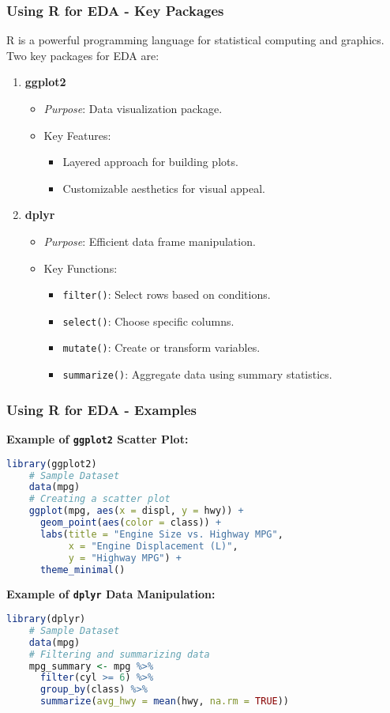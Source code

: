 \documentclass[aspectratio=169]{beamer}
\begin{document}
\begin{frame}[fragile]
    \frametitle{Using R for EDA - Key Packages}
    R is a powerful programming language for statistical computing and graphics. Two key packages for EDA are:

    \begin{enumerate}
        \item \textbf{ggplot2}
        \begin{itemize}
            \item \textit{Purpose}: Data visualization package.
            \item Key Features:
            \begin{itemize}
                \item Layered approach for building plots.
                \item Customizable aesthetics for visual appeal.
            \end{itemize}
        \end{itemize}

        \item \textbf{dplyr}
        \begin{itemize}
            \item \textit{Purpose}: Efficient data frame manipulation.
            \item Key Functions:
            \begin{itemize}
                \item \texttt{filter()}: Select rows based on conditions.
                \item \texttt{select()}: Choose specific columns.
                \item \texttt{mutate()}: Create or transform variables.
                \item \texttt{summarize()}: Aggregate data using summary statistics.
            \end{itemize}
        \end{itemize}
    \end{enumerate}
\end{frame}

\begin{frame}[fragile]
    \frametitle{Using R for EDA - Examples}
    \textbf{Example of \texttt{ggplot2} Scatter Plot:}
    \begin{lstlisting}[language=R]
    library(ggplot2)
    # Sample Dataset
    data(mpg)
    # Creating a scatter plot
    ggplot(mpg, aes(x = displ, y = hwy)) +
      geom_point(aes(color = class)) + 
      labs(title = "Engine Size vs. Highway MPG",
           x = "Engine Displacement (L)",
           y = "Highway MPG") +
      theme_minimal()
    \end{lstlisting}

    \textbf{Example of \texttt{dplyr} Data Manipulation:}
    \begin{lstlisting}[language=R]
    library(dplyr)
    # Sample Dataset
    data(mpg)
    # Filtering and summarizing data
    mpg_summary <- mpg %>%
      filter(cyl >= 6) %>%
      group_by(class) %>%
      summarize(avg_hwy = mean(hwy, na.rm = TRUE))
    \end{lstlisting}
\end{frame}
\end{document}
